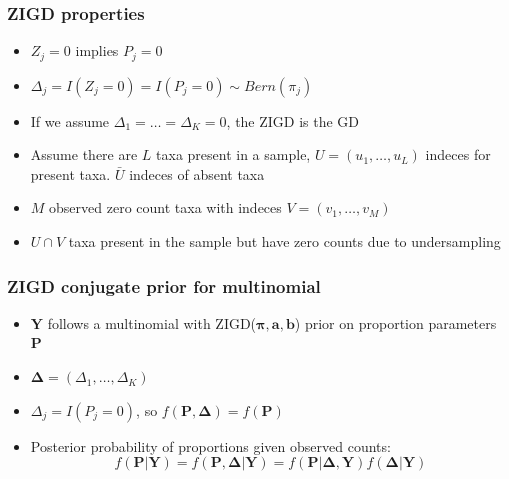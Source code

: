 \documentclass{beamer}
\begin{document}
\begin{frame}
\frametitle{ZIGD properties}
\begin{itemize}
  \item $Z_j = 0$ implies $P_j = 0$
  \item $\Delta_j = I(Z_j = 0) = I(P_j = 0) \sim Bern(\pi_j)$
  \item If we assume $\Delta_1 = \ldots = \Delta_K = 0$, the ZIGD is the GD
  \item Assume there are $L$ taxa present in a sample, $U = (u_1, \ldots , u_L)$ indeces for present taxa. $\bar U$ indeces of absent taxa
  \item $M$ observed zero count taxa  with indeces $V = (v_1, \ldots , v_M)$
  \item $U\cap V$ taxa present in the sample but have zero counts due to undersampling
\end{itemize}
\end{frame}

\begin{frame}
\frametitle{ZIGD conjugate prior for multinomial}

\begin{itemize}
  \item $\bm{Y}$ follows a multinomial with ZIGD($\boldsymbol\pi, \bm{a}, \bm{b}$) prior on proportion parameters $\bm{P}$
  \item $\boldsymbol\Delta = (\Delta_1, \ldots , \Delta_K)$
  \item $\Delta_j = I(P_j = 0)$, so $f(\bm{P}, \boldsymbol\Delta) = f(\bm{P})$
  \item Posterior probability of proportions given observed counts:
   $$f(\bm{P}| \bm{Y}) = f(\bm{P},\boldsymbol\Delta | \bm{Y}) = f(\bm{P}| \boldsymbol\Delta, \bm{Y})f(\boldsymbol\Delta | \bm{Y})$$
\end{itemize}
\end{frame}
\end{document}
